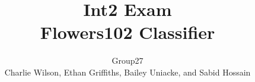 \documentclass[journal]{./IEEEtran}
\begin{document}
		\title{Int2 Exam\\ Flowers102 Classifier}
		
		\author{Group27\\
			\vspace{0.1cm}
			Charlie Wilson,
			Ethan Griffiths,
			Bailey Uniacke, and
			Sabid Hossain}
	
	
	
	
\end{document}
